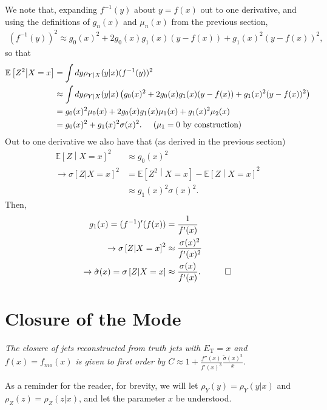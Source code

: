 We note that, expanding $f^{-1}(y)$ about $y=f(x)$ out to one derivative, and using the definitions of $g_n(x)$ and $\mu_n(x)$ from the previous section,
\begin{align}
(f^{-1}(y))^2 \approx g_0(x)^2+2g_0(x)g_1(x)(y-f(x))+g_1(x)^2(y-f(x))^2,
\end{align}
so that
\begin{align}
\mathbb{E}\left[Z^2\middle| X=x\right]&=\int dy \rho_{Y|X}(y|x) (f^{-1}(y))^2\nonumber\\
&\approx\int dy \rho_{Y|X}(y|x) \left(g_0(x)^2+2g_0(x)g_1(x)(y-f(x))+g_1(x)^2(y-f(x))^2\right)\nonumber\\
&=g_0(x)^2\mu_0(x)+2g_0(x)g_1(x)\mu_1(x)+g_1(x)^2\mu_2(x)\nonumber\\
&=g_0(x)^2+g_1(x)^2\sigma(x)^2.\hspace{5mm}\text{($\mu_1=0$ by construction)}
\end{align}
Out to one derivative we also have that (as derived in the previous section)
\begin{align}
\mathbb{E}\left[Z\middle| X=x\right]^2 &\approx g_0(x)^2\nonumber\\
\rightarrow \sigma\left[Z|X=x\right]^2 &= \mathbb{E}\left[Z^2\middle| X=x\right]-\mathbb{E}\left[Z\middle| X=x\right]^2\nonumber\\
&\approx g_1(x)^2\sigma(x)^2.
\end{align}
Then,
\begin{align}
g_1(x) = (f^{-1})'(f(x)) &= \frac{1}{f'(x)}\nonumber\\
\rightarrow \sigma\left[Z|X=x\right]^2 &\approx \frac{\sigma(x)^2}{f'(x)^2}\nonumber\\
\rightarrow \hat{\sigma}(x)=\sigma\left[Z|X=x\right] &\approx \frac{\sigma(x)}{f'(x)}. \hspace{1 cm} \Box \label{eqn:NI:resolution}
\end{align}

\section{Closure of the Mode}
\label{sec:NI:calibrated_mode_calculation}
{\it The closure of jets reconstructed from truth jets with $E_\text{T} = x$ and $f(x)=f_{mo}(x)$ is given to first order by $C\approx 1+\frac{f''(x)}{f'(x)^3}\frac{\tilde{\sigma}(x)^2}{x}$.}

\vspace{5mm}

As a reminder for the reader, for brevity, we will let $\rho_Y(y)=\rho_Y(y|x)$ and $\rho_Z(z)=\rho_Z(z|x)$, and let the parameter $x$ be understood.

